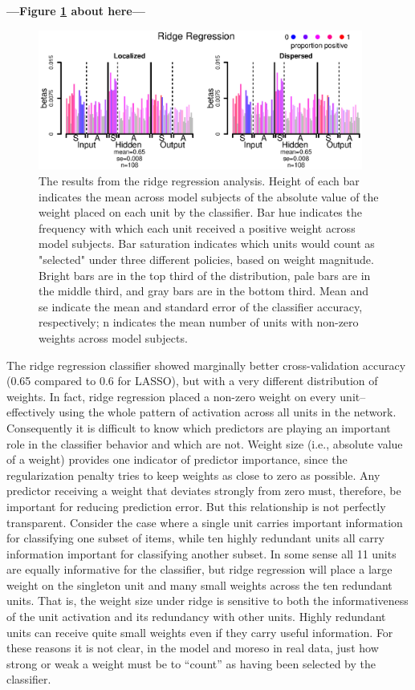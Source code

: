 \begin{center}
\textbf{---Figure \ref{fig.ridge} about here---}
\end{center}

\begin{figure}
\centering
\includegraphics[width=0.95\textwidth]{figures/ridge_only.eps}
\caption{\label{fig.ridge} The results from the ridge regression analysis. Height of each bar indicates the mean across model subjects of the absolute value of the weight placed on each unit by the classifier. Bar hue indicates the frequency with which each unit received a positive weight across model subjects. Bar saturation indicates which units would count as "selected" under three different policies, based on weight magnitude. Bright bars are in the top third of the distribution, pale bars are in the middle third, and gray bars are in the bottom third. Mean and se indicate the mean and standard error of the classifier accuracy, respectively; n indicates the mean number of units with non-zero weights across model subjects.}
\end{figure}

The ridge regression classifier showed marginally better cross-validation accuracy (0.65 compared to 0.6 for LASSO), but with a very different distribution of weights. In fact, ridge regression placed a non-zero weight on every unit--effectively using the whole pattern of activation across all units in the network. Consequently it is difficult to know which predictors are playing an important role in the classifier behavior and which are not. Weight size (i.e., absolute value of a weight) provides one indicator of predictor importance, since the regularization penalty tries to keep weights as close to zero as possible. Any predictor receiving a weight that deviates strongly from zero must, therefore, be important for reducing prediction error. But this relationship is not perfectly transparent. Consider the case where a single unit carries important information for classifying one subset of items, while ten highly redundant units all carry information important for classifying another subset. In some sense all 11 units are equally informative for the classifier, but ridge regression will place a large weight on the singleton unit and many small weights across the ten redundant units. That is, the weight size under ridge is sensitive to both the informativeness of the unit activation and its redundancy with other units. Highly redundant units can receive quite small weights even if they carry useful information. For these reasons it is not clear, in the model and moreso in real data, just how strong or weak a weight must be to ``count'' as having been selected by the classifier. 

